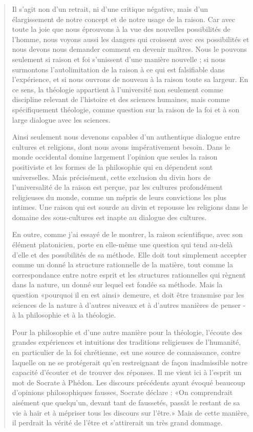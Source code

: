 \begin{quote}
Il s'agit non d'un retrait, ni d'une critique négative, mais d'un élargissement de notre concept et de notre usage de la raison. Car avec toute la joie que nous éprouvons à la vue des nouvelles possibilités de l'homme, nous voyons aussi les dangers qui croissent avec ces possibilités et nous devons nous demander comment en devenir maîtres. Nous le pouvons seulement si raison et foi s'unissent d'une manière nouvelle ; si nous surmontons l'autolimitation de la raison à ce qui est falsifiable dans l'expérience, et si nous ouvrons de nouveau à la raison toute sa largeur. En ce sens, la théologie appartient à l'université non seulement comme discipline relevant de l'histoire et des sciences humaines, mais comme spécifiquement théologie, comme question sur la raison de la foi et à son large dialogue avec les sciences.

Ainsi seulement nous devenons capables d'un authentique dialogue entre cultures et religions, dont nous avons impérativement besoin. Dans le monde occidental domine largement l'opinion que seules la raison positiviste et les formes de la philosophie qui en dépendent sont universelles. Mais précisément, cette exclusion du divin hors de l'universalité de la raison est perçue, par les cultures profondément religieuses du monde, comme un mépris de leurs convictions les plus intimes. Une raison qui est sourde au divin et repousse les religions dans le domaine des sous-cultures est inapte au dialogue des cultures.

En outre, comme j'ai essayé de le montrer, la raison scientifique, avec son élément platonicien, porte en elle-même une question qui tend au-delà d'elle et des possibilités de sa méthode. Elle doit tout simplement accepter comme un donné la structure rationnelle de la matière, tout comme la correspondance entre notre esprit et les structures rationnelles qui règnent dans la nature, un donné sur lequel est fondée sa méthode. Mais la question «pourquoi il en est ainsi» demeure, et doit être transmise par les sciences de la nature à d'autres niveaux et à d'autres manières de penser - à la philosophie et à la théologie.

Pour la philosophie et d'une autre manière pour la théologie, l'écoute des grandes expériences et intuitions des traditions religieuses de l'humanité, en particulier de la foi chrétienne, est une source de connaissance, contre laquelle on ne se protégerait qu'en restreignant de façon inadmissible notre capacité d'écouter et de trouver des réponses. Il me vient ici à l'esprit un mot de Socrate à Phédon. Les discours précédents ayant évoqué beaucoup d'opinions philosophiques fausses, Socrate déclare : «On comprendrait aisément que quelqu'un, devant tant de faussetés, passât le restant de sa vie à haïr et à mépriser tous les discours sur l'être.» Mais de cette manière, il perdrait la vérité de l'être et s'attirerait un très grand dommage.


\end{quote}
